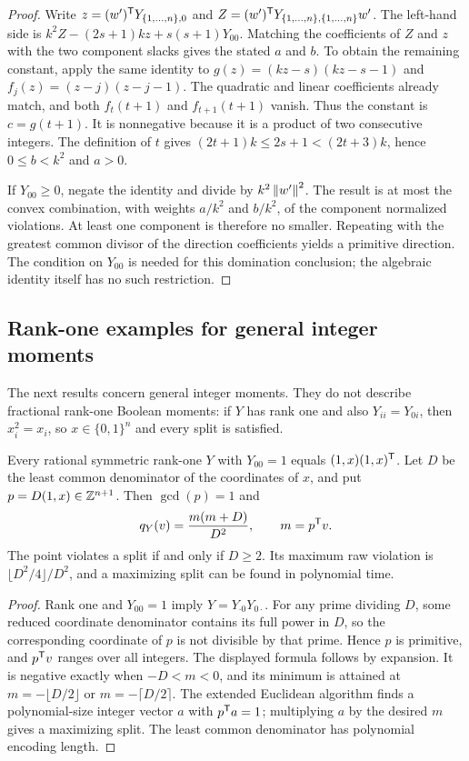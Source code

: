 \begin{proof}
Write $z=(w')^{\mathsf T} Y_{\{1,\ldots,n\},0}$ and
$Z=(w')^{\mathsf T} Y_{\{1,\ldots,n\},\{1,\ldots,n\}}w'$. The left-hand side is
$k^2Z-(2s+1)kz+s(s+1)Y_{00}$. Matching the coefficients of $Z$ and $z$
with the two component slacks gives the stated $a$ and $b$. To obtain
the remaining constant, apply the same identity to
$g(z)=(kz-s)(kz-s-1)$ and $f_j(z)=(z-j)(z-j-1)$.
The quadratic and linear coefficients already match, and both
$f_t(t+1)$ and $f_{t+1}(t+1)$ vanish. Thus the constant is
$c=g(t+1)$. It is nonnegative because it is a product of two consecutive
integers. The definition of $t$ gives
$(2t+1)k\le2s+1<(2t+3)k$, hence $0\le b<k^2$ and $a>0$.

If $Y_{00}\ge0$, negate the identity and divide by
$k^2\left\lVert w'\right\rVert^2$. The result is at most the convex combination, with
weights $a/k^2$ and $b/k^2$, of the component normalized violations.
At least one component is therefore no smaller. Repeating with the
greatest common divisor of the direction coefficients yields a
primitive direction. The condition on $Y_{00}$ is needed for this
domination conclusion; the algebraic identity itself has no such
restriction.
\end{proof}

\subsection{Rank-one examples for general integer moments}

The next results concern general integer moments. They do not describe
fractional rank-one Boolean moments: if $Y$ has rank one and also
$Y_{ii}=Y_{0i}$, then $x_i^2=x_i$, so $x\in\{0,1\}^n$ and every split is
satisfied.

\begin{proposition}\label{prop:rank-one-split-value}
Every rational symmetric rank-one $Y$ with $Y_{00}=1$ equals
$(1,x)(1,x)^{\mathsf T}$. Let $D$ be the least common denominator of the
coordinates of $x$, and put $p=D(1,x)\in\mathbb Z^{n+1}$. Then $\gcd(p)=1$ and
\[
 q_Y(v)=\frac{m(m+D)}{D^2},\qquad m=p^{\mathsf T} v.
\]
The point violates a split if and only if $D\ge2$. Its maximum raw
violation is $\lfloor D^2/4\rfloor/D^2$, and a maximizing split can be
found in polynomial time.
\end{proposition}

\begin{proof}
Rank one and $Y_{00}=1$ imply $Y=Y_{\cdot0}Y_{0\cdot}$. For any prime
dividing $D$, some reduced coordinate denominator contains its full
power in $D$, so the corresponding coordinate of $p$ is not divisible
by that prime. Hence $p$ is primitive, and $p^{\mathsf T} v$ ranges over all
integers. The displayed formula follows by expansion. It is negative
exactly when $-D<m<0$, and its minimum is attained at
$m=-\lfloor D/2\rfloor$ or $m=-\lceil D/2\rceil$. The extended Euclidean
algorithm finds a polynomial-size integer vector $a$ with
$p^{\mathsf T} a=1$; multiplying $a$ by the desired $m$ gives a maximizing
split. The least common denominator has polynomial encoding length.
\end{proof}

